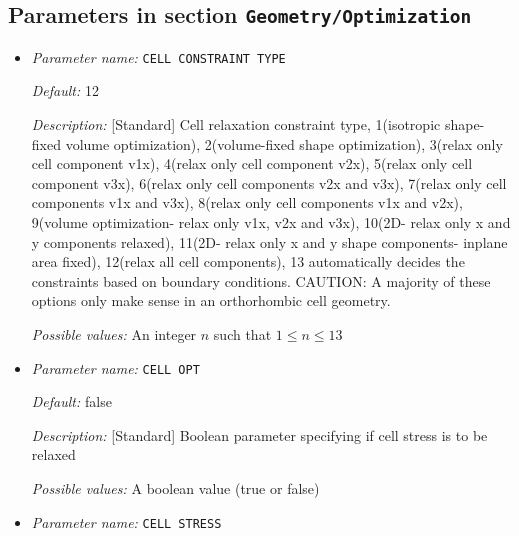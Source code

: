 


\subsection{Parameters in section \tt Geometry/Optimization}
\label{parameters:Geometry/Optimization}

\begin{itemize}
\item {\it Parameter name:} {\tt CELL CONSTRAINT TYPE}
\label{parameters:Geometry/Optimization/CELL CONSTRAINT TYPE}
\label{parameters:Geometry/Optimization/CELL_20CONSTRAINT_20TYPE}




{\it Default:} 12


{\it Description:} [Standard] Cell relaxation constraint type, 1(isotropic shape-fixed volume optimization), 2(volume-fixed shape optimization), 3(relax only cell component v1x), 4(relax only cell component v2x), 5(relax only cell component v3x), 6(relax only cell components v2x and v3x), 7(relax only cell components v1x and v3x), 8(relax only cell components v1x and v2x), 9(volume optimization- relax only v1x, v2x and v3x), 10(2D- relax only x and y components relaxed), 11(2D- relax only x and y shape components- inplane area fixed), 12(relax all cell components), 13 automatically decides the constraints based on boundary conditions. CAUTION: A majority of these options only make sense in an orthorhombic cell geometry.


{\it Possible values:} An integer $n$ such that $1\leq n \leq 13$
\item {\it Parameter name:} {\tt CELL OPT}
\label{parameters:Geometry/Optimization/CELL OPT}
\label{parameters:Geometry/Optimization/CELL_20OPT}




{\it Default:} false


{\it Description:} [Standard] Boolean parameter specifying if cell stress is to be relaxed


{\it Possible values:} A boolean value (true or false)
\item {\it Parameter name:} {\tt CELL STRESS}
\label{parameters:Geometry/Optimization/CELL STRESS}
\label{parameters:Geometry/Optimization/CELL_20STRESS}





\end{itemize}
